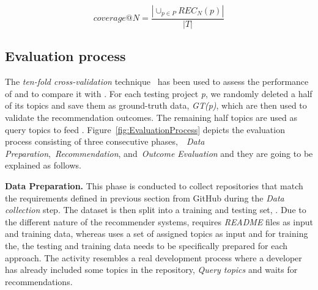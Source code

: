 \begin{equation}\label{eqn:Coverage}
coverage@N = \frac{\left | \cup_{p\in P} REC_{N}(p) \right | }{\left | T \right |} 
\end{equation}

\vspace{.1cm}




\subsection{Evaluation process}\label{sec:methodology-metric}
The \emph{ten-fold cross-validation} technique~\cite{kohavi1995study} has been used to assess the performance of \TF and to compare it with \MNB. %
For each testing project \emph{p}, we randomly deleted a half of its topics and save them as ground-truth data, \emph{GT(p)}, which are then used to validate the recommendation outcomes. The remaining half topics are used as query topics to feed \TF. Figure~\ref{fig:EvaluationProcess} depicts the evaluation process consisting of three consecutive phases,~\ie~\emph{Data Preparation},~\emph{Recommendation}, and~\emph{Outcome Evaluation} and they are going to be explained as follows.

\vspace{.1cm}
\noindent\textbf{Data Preparation.}
This phase is conducted to collect repositories that match the requirements defined in previous section from GitHub during the \textit{Data collection} step. %
The dataset is then split into a training and testing set, \ie {}. Due to the different nature of the recommender systems, \ie \MNB requires \textit{README} files as input and training data, whereas \TF uses a set of assigned topics as input and for training the, the testing and training data needs to be specifically prepared for each approach.
The  activity resembles a real development process where a developer has already included some topics in the repository, \ie \textit{Query topics} and waits for recommendations. 



